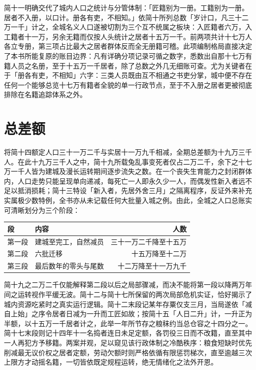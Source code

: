 简十一明确交代了城内人口之统计与分管体制：「匠籍别为一册。工籍别为一册。居者不入册，以口计。册各有吏，不相知。」依简十所列总数「岁计口，凡三十二万一千」计之，全城名义人口遂被切割为三个互不统属之板块：入匠籍者六万，入工籍者十一万，另余无籍而仅按人头统计之居者十五万一千。前两项共计十七万人各立专册，第三项占比最大之居者群体反而全无册籍可稽。此项编制格局直接决定了本书所能复原的账目边界：凡有详确分项记录可循之数字，悉数出自那十七万有籍人员之名册，至于十五万一千居者，除了总数之外几无细账可查。尤为关键者在于「册各有吏，不相知」六字：三类人员既由互不相通之书吏分掌，城中便不存在任何一个能够总览十七万有籍者全貌的单一行政节点，至于不入册之居者更被彻底排除在名籍追踪体系之外。

\section{总差额}

将简十四额定人口三十一万二千与实居十一万九千相减，全期总差额为十九万三千人。在此十九万三千人之中，简十九所载兔乱事变死者仅占二万二千，余下之十七万一千人皆为建城及漫长运转期间逐步流失之数。在一个丧失生育能力之封闭群体内，人口走势只能呈现单向递减，每死亡一人即永久少一人，而偶发性新入者远不足以抵消损耗；简十三特设「新入者，先居外舍三月」之隔离程序，反证外来补充实属极少数特例，全书亦从未记载任何大批量入城之例。由此，全城之人口总账实可清晰划分为三个阶段：

\begin{center}
\small
\begin{tabular}{@{}llr@{}}
\toprule
段 & 内容 & 人数\\
\midrule
第一段 & 建城至完工，自然减员 & 三十一万二千降至十五万\\
第二段 & 六批迁移 & 十五万降至十二万\\
第三段 & 最后数年的零头与尾数 & 十二万降至十一万九千\\
\bottomrule
\end{tabular}
\end{center}

简十九之二万二千仅能解释第二段以后之局部骤减，而决不能将第一段以降两万年间之运转视作平缓无波。简十二与简十七所保留的两次局部危机实证，恰好揭示了城内资源吃紧时之真实运行逻辑。简十二末段记某年存粟仅支三月，当局遂依「减自上始」之序令居者日减为一升而工匠如故；按简十五「人日二升」计，一升正为半额，以十五万一千居者计之，此举一年所节存之粮秣约当总仓容之十四分之一。简十七末段则记十四年十一名捣者连日未足定额，各罚役三日而不改籍，直至其中一人再犯方予移籍。两案并观，足以窥见该行政体制之冷酷秩序：粮食短缺时优先削减最无议价权之居者定额，劳动欠额时则严格依循有限惩罚梯次，直至逾越三次上限方才动摇名籍，一切皆依既定规程运转，绝无情绪化之法外开恩。

